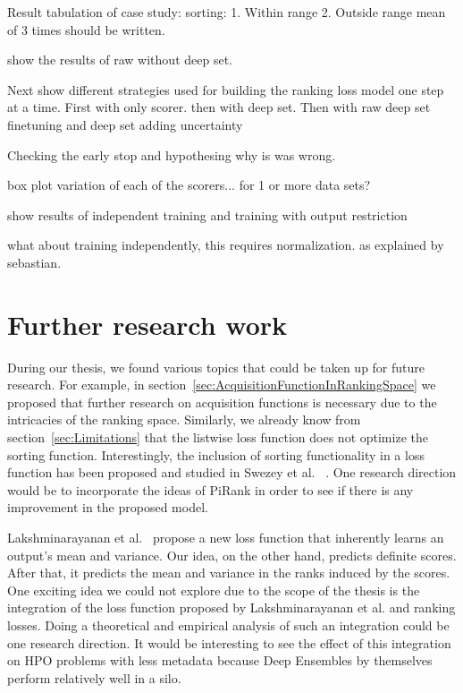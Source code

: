 \documentclass[12pt, twoside, ngerman]{report}
\begin{document}
Result tabulation of case study: sorting:
1.  Within range
2.   Outside range 
mean of 3 times should be written.

show the results of raw without deep set.

Next show different strategies used for building the ranking loss model one step at a time.
First with only scorer.
then with deep set.
Then with raw deep set
finetuning and deep set
adding uncertainty

Checking the early stop and hypothesing why is was wrong.

box plot variation of each of the scorers... for 1 or more data sets?

show results of independent training and training with output restriction

what about training independently,   this requires normalization. 
as explained by sebastian.
\fi

\section{Further research work}

During our thesis, we found various topics that could be taken up for future research. For example, in section~\ref{sec:AcquisitionFunctionInRankingSpace} we proposed that further research on acquisition functions is necessary due to the intricacies of the ranking space. Similarly, we already know from section~\ref{sec:Limitations} that the listwise loss function does not optimize the sorting function.
Interestingly, the inclusion of sorting functionality in a loss function has been proposed and studied in Swezey et al. ~\cite{PiRank}.
One research direction would be to incorporate the ideas of PiRank in order to see if there is any improvement in the proposed model.

Lakshminarayanan et al.~\cite{DeepEnsemblePaper} propose a new loss function that inherently learns an output's mean and variance. Our idea, on the other hand, predicts definite scores. After that, it predicts the mean and variance in the ranks induced by the scores. One exciting idea we could not explore due to the scope of the thesis is the integration of the loss function proposed by Lakshminarayanan et al. and ranking losses. Doing a theoretical and empirical analysis of such an integration could be one research direction.
It would be interesting to see the effect of this integration on HPO problems with less metadata because Deep Ensembles by themselves perform relatively well in a silo.
\end{document}
